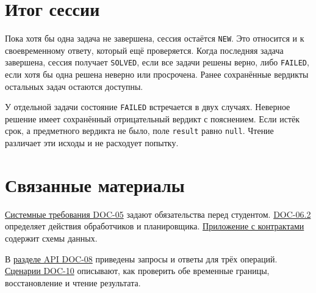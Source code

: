 \documentclass[12pt,a4paper]{article}
\begin{document}
\section{Итог сессии}\label{ux438ux442ux43eux433-ux441ux435ux441ux441ux438ux438}

\hypertarget{итог-сессии}{}

Пока хотя бы одна задача не завершена, сессия остаётся \texttt{NEW}. Это относится и к своевременному ответу, который ещё проверяется. Когда последняя задача завершена, сессия получает \texttt{SOLVED}, если все задачи решены верно, либо \texttt{FAILED}, если хотя бы одна решена неверно или просрочена. Ранее сохранённые вердикты остальных задач остаются доступны.

У отдельной задачи состояние \texttt{FAILED} встречается в двух случаях. Неверное решение имеет сохранённый отрицательный вердикт с пояснением. Если истёк срок, а предметного вердикта не было, поле \texttt{result} равно \texttt{null}. Чтение различает эти исходы и не расходует попытку.

\section{Связанные материалы}\label{ux441ux432ux44fux437ux430ux43dux43dux44bux435-ux43cux430ux442ux435ux440ux438ux430ux43bux44b}

\hypertarget{связанные-материалы}{}

{\href{../04\_Системные\_требования/DOC-05\_Системные\_требования.pdf\#doc-05-требования-к-сессиям-задач}{Системные требования DOC-05}} задают обязательства перед студентом. {\href{../07\_Программные\_требования/DOC-06.2\_Сессии\_задач\_и\_планировщик.pdf\#doc-062-сессии-задач-и-планировщик}{DOC-06.2}} определяет действия обработчиков и планировщика. {\href{../07\_Программные\_требования/DOC-06.2\_Сессии\_задач\_и\_планировщик.pdf\#doc-062-контракты-сессий-задач}{Приложение с контрактами}} содержит схемы данных.

В {\href{../09\_Архитектура\_и\_API/DOC-08\_Справочник\_API.pdf\#doc-08-справочник-api-сессии-задач}{разделе API DOC-08}} приведены запросы и ответы для трёх операций. {\href{../10\_Верификация\_и\_тестирование/DOC-10\_План\_верификации.pdf\#doc-10-верификация-сессий-задач-и-планировщика}{Сценарии DOC-10}} описывают, как проверить обе временные границы, восстановление и чтение результата.
\end{document}
